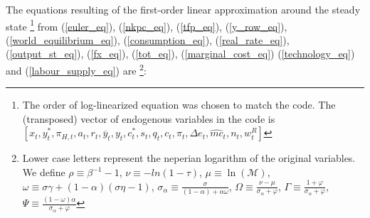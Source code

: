\documentclass{article}
\begin{document}
The equations resulting of the first-order linear approximation around the steady state \footnote{The order of log-linearized equation was chosen to match the code. The (transposed) vector of endogenous variables in the code is $[x_t, y_t^*, \pi_{H,t}, a_t, r_t, \overline{y}_t, y_t, c_t^*, s_t, q_t, c_t, \pi_t, \Delta e_t, \widehat{mc}_t, n_t, w_t^R]$} from (\ref{euler_eq}), (\ref{nkpc_eq}), (\ref{tfp_eq}), (\ref{y_row_eq}), (\ref{world_equilibrium_eq}), (\ref{consumption_eq}), (\ref{real_rate_eq}), (\ref{output_st_eq}), (\ref{fx_eq}), (\ref{tot_eq}), (\ref{marginal_cost_eq}) (\ref{technology_eq}) and (\ref{labour_supply_eq}) are \footnote{Lower case letters represent the neperian logarithm of the original variables. We define $\rho \equiv \beta^{-1} -1$,  $\nu \equiv -ln(1-\tau)$, $\mu \equiv \ln(\mathcal M)$, $\omega \equiv \sigma \gamma + (1-\alpha)(\sigma \eta - 1)$, $\sigma_\alpha \equiv \frac{\sigma}{(1-\alpha) + \alpha \omega}$, $\Omega \equiv \frac{\nu - \mu}{\sigma_\alpha + \varphi}$, $\Gamma \equiv \frac{1 + \varphi}{\sigma_\alpha + \varphi}$, $\Psi \equiv \frac{(1-\omega) \alpha}{\sigma_\alpha + \varphi}$}:
\end{document}
